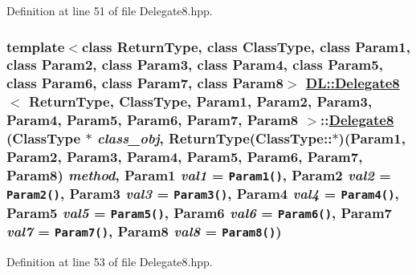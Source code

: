 Definition at line 51 of file Delegate8.hpp.\hypertarget{classDL_1_1Delegate8_a0}{
\subsubsection[Delegate8]{\setlength{\rightskip}{0pt plus 5cm}template$<$class Return\-Type, class Class\-Type, class Param1, class Param2, class Param3, class Param4, class Param5, class Param6, class Param7, class Param8$>$ \hyperlink{classDL_1_1Delegate8}{DL::Delegate8}$<$ Return\-Type, Class\-Type, Param1, Param2, Param3, Param4, Param5, Param6, Param7, Param8 $>$::\hyperlink{classDL_1_1Delegate8}{Delegate8} (Class\-Type $\ast$ {\em class\_\-obj}, Return\-Type(Class\-Type::$\ast$)(Param1, Param2, Param3, Param4, Param5, Param6, Param7, Param8) {\em method}, Param1 {\em val1} = {\tt Param1()}, Param2 {\em val2} = {\tt Param2()}, Param3 {\em val3} = {\tt Param3()}, Param4 {\em val4} = {\tt Param4()}, Param5 {\em val5} = {\tt Param5()}, Param6 {\em val6} = {\tt Param6()}, Param7 {\em val7} = {\tt Param7()}, Param8 {\em val8} = {\tt Param8()})}}
\label{classDL_1_1Delegate8_a0}




Definition at line 53 of file Delegate8.hpp.

